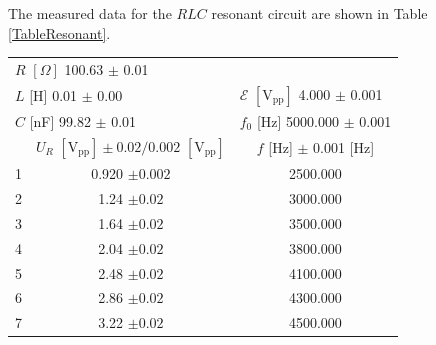 \documentclass{article}
\begin{document}
The measured data for the $RLC$ resonant circuit are shown in Table \ref{TableResonant}.
\begin{table}[H]\centering
    \begin{tabular}{ccc}
        \toprule
        \multicolumn{2}{l}{$R\,\,[\Omega]$ 100.63 $\pm$ 0.01} &                                                                                                           \\
        \multicolumn{2}{l}{$L$ [H] 0.01 $\pm$ 0.00}           & \multicolumn{1}{l}{$\mathcal{E}\,\,[\text{V}_{\text{pp}}]$ 4.000 $\pm$ 0.001}                             \\
        \multicolumn{2}{l}{$C$ [nF] 99.82 $\pm$ 0.01}         & \multicolumn{1}{l}{$f_0$ [Hz] 5000.000 $\pm$ 0.001}                                                       \\
        \midrule
                                                              & $U_R\,\,[\text{V}_\text{pp}] \pm 0.02/0.002\,\,[\text{V}_\text{pp}]$          & $f$ [Hz] $\pm$ 0.001 [Hz] \\
        \midrule
        1                                                     & 0.920 $\pm 0.002$                                                             & 2500.000                  \\
        2                                                     & 1.24  $\pm 0.02$                                                              & 3000.000                  \\
        3                                                     & 1.64  $\pm 0.02$                                                              & 3500.000                  \\
        4                                                     & 2.04  $\pm 0.02$                                                              & 3800.000                  \\
        5                                                     & 2.48  $\pm 0.02$                                                              & 4100.000                  \\
        6                                                     & 2.86  $\pm 0.02$                                                              & 4300.000                  \\
        7                                                     & 3.22  $\pm 0.02$                                                              & 4500.000                  \\

\end{tabular}
\end{table}
\end{document}
